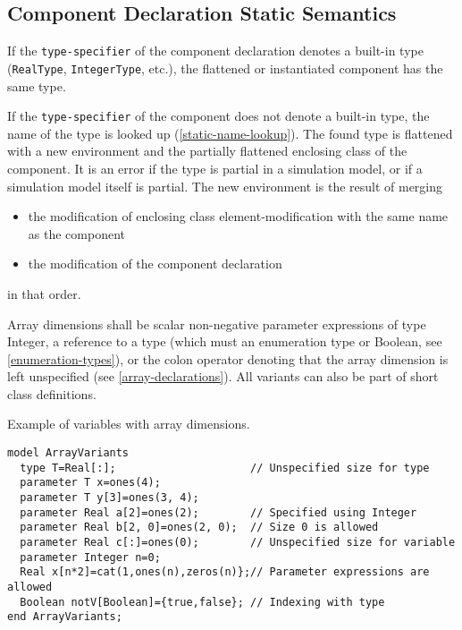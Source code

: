 \subsection{Component Declaration Static Semantics}

If the \lstinline!type-specifier! of the component declaration denotes a built-in
type (\lstinline!RealType!, \lstinline!IntegerType!, etc.), the flattened or instantiated
component has the same type.

If the \lstinline!type-specifier! of the component does not denote a built-in type,
the name of the type is looked up (\autoref{static-name-lookup}). The found type is
flattened with a new environment and the partially flattened enclosing
class of the component. It is an error if the type is partial in a
simulation model, or if a simulation model itself is partial. The new
environment is the result of merging

\begin{itemize}
\item
  the modification of enclosing class element-modification with the same
  name as the component
\item
  the modification of the component declaration
\end{itemize}
in that order.

Array dimensions shall be scalar non-negative parameter expressions of type Integer,
a reference to a type (which must an enumeration type or Boolean, see \autoref{enumeration-types}),
or the colon operator denoting that the array dimension is left unspecified (see \autoref{array-declarations}).
All variants can also be part of short class definitions.

\begin{nonnormative}
Example of variables with array dimensions.
\begin{lstlisting}[language=modelica]
model ArrayVariants
  type T=Real[:];                     // Unspecified size for type
  parameter T x=ones(4);
  parameter T y[3]=ones(3, 4);
  parameter Real a[2]=ones(2);        // Specified using Integer
  parameter Real b[2, 0]=ones(2, 0);  // Size 0 is allowed
  parameter Real c[:]=ones(0);        // Unspecified size for variable
  parameter Integer n=0;
  Real x[n*2]=cat(1,ones(n),zeros(n)};// Parameter expressions are allowed
  Boolean notV[Boolean]={true,false}; // Indexing with type
end ArrayVariants;
\end{lstlisting}
\end{nonnormative}

